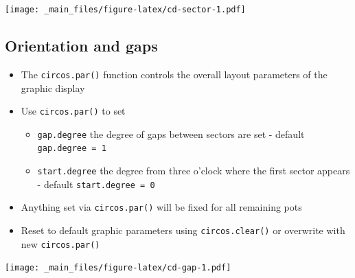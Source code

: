 \documentclass[
]{book}
\newenvironment{Shaded}{\begin{snugshade}}{\end{snugshade}}
\newcommand{\AttributeTok}[1]{\textcolor[rgb]{0.77,0.63,0.00}{#1}}
\newcommand{\CommentTok}[1]{\textcolor[rgb]{0.56,0.35,0.01}{\textit{#1}}}
\newcommand{\DecValTok}[1]{\textcolor[rgb]{0.00,0.00,0.81}{#1}}
\newcommand{\FunctionTok}[1]{\textcolor[rgb]{0.00,0.00,0.00}{#1}}
\newcommand{\NormalTok}[1]{#1}
\newcommand{\SpecialCharTok}[1]{\textcolor[rgb]{0.00,0.00,0.00}{#1}}
\providecommand{\tightlist}{%
  \setlength{\itemsep}{0pt}\setlength{\parskip}{0pt}}
\begin{document}
\texttt{[image: \_main\_files/figure-latex/cd-sector-1.pdf]}

\hypertarget{orientation-and-gaps}{%
\subsection{Orientation and gaps}\label{orientation-and-gaps}}

\begin{itemize}
\tightlist
\item
  The \texttt{circos.par()} function controls the overall layout parameters of the graphic display
\item
  Use \texttt{circos.par()} to set

  \begin{itemize}
  \tightlist
  \item
    \texttt{gap.degree} the degree of gaps between sectors are set - default \texttt{gap.degree\ =\ 1}
  \item
    \texttt{start.degree} the degree from three o'clock where the first sector appears - default \texttt{start.degree\ =\ 0}
  \end{itemize}
\item
  Anything set via \texttt{circos.par()} will be fixed for all remaining pots
\item
  Reset to default graphic parameters using \texttt{circos.clear()} or overwrite with new \texttt{circos.par()}
\end{itemize}

\begin{Shaded}
\end{Shaded}

\texttt{[image: \_main\_files/figure-latex/cd-gap-1.pdf]}

\begin{Shaded}
\end{Shaded}
\end{document}
